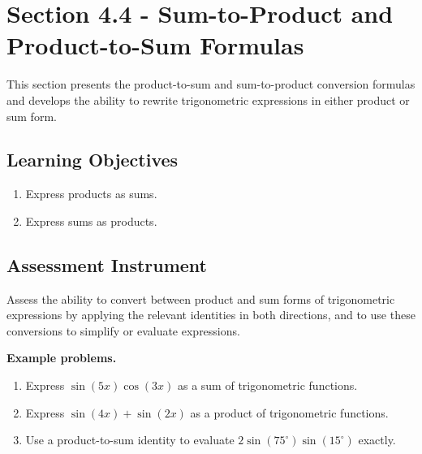 \section{Section 4.4 - Sum-to-Product and Product-to-Sum Formulas}
\label{sec:sect-f015}

This section presents the product-to-sum and sum-to-product conversion formulas and
develops the ability to rewrite trigonometric expressions in either product or sum form.

\subsection{Learning Objectives}
\label{ssec:lear-fe6e}

\begin{enumerate}
    \item Express products as sums.
    \item Express sums as products.
\end{enumerate}

\subsection{Assessment Instrument}
\label{ssec:asse-3669}

Assess the ability to convert between product and sum forms of trigonometric expressions
by applying the relevant identities in both directions, and to use these conversions to
simplify or evaluate expressions.

\textbf{Example problems.}
\begin{enumerate}
    \item Express $\sin(5x)\cos(3x)$ as a sum of trigonometric functions.
    \item Express $\sin(4x) + \sin(2x)$ as a product of trigonometric functions.
    \item Use a product-to-sum identity to evaluate $2\sin(75^{\circ})\sin(15^{\circ})$ exactly.
\end{enumerate}

